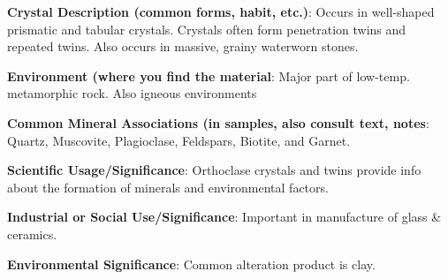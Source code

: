 \documentclass[10pt]{article}
\begin{document}
\begin{framed}
  \textbf{Crystal Description (common forms, habit, etc.)}: Occurs in well-shaped prismatic and tabular crystals. Crystals often form penetration twins and repeated twins. Also occurs in massive, grainy waterworn stones.
\end{framed}

\begin{framed}
  \textbf{Environment (where you find the material}: Major part of low-temp. metamorphic rock. Also igneous environments
\end{framed}

\begin{framed}
  \textbf{Common Mineral Associations (in samples, also consult text, notes}: Quartz, Muscovite, Plagioclase, Feldspars, Biotite, and Garnet.
\end{framed}

\begin{framed}
  \textbf{Scientific Usage/Significance}: Orthoclase crystals and twins provide info about the formation of minerals and environmental factors.
\end{framed}

\begin{framed}
  \textbf{Industrial or Social Use/Significance}: Important in manufacture of glass \& ceramics.
\end{framed}

\begin{framed}
  \textbf{Environmental Significance}: Common alteration product is clay.
\end{framed}

\end{document}
